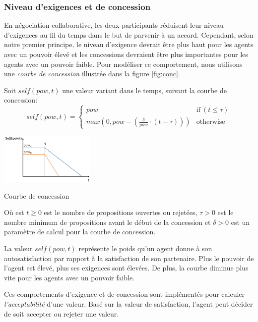 			\subsubsection {Niveau d'exigences et de concession}
			
			En négociation collaborative, les deux participants réduisent leur niveau d'exigences au fil du temps dans le but de parvenir à un accord. Cependant, selon notre premier principe, le niveau d'exigence devrait être plus haut pour les agents avec un pouvoir élevé et les concessions devraient être plus importantes pour les agents avec un pouvoir faible. Pour modéliser ce comportement, nous utilisons une \emph {courbe de concession} illustrée dans la figure \ref {fig:conc}.
			
			Soit $ self (pow, t) $ une valeur variant dans le temps, suivant la courbe de concession:
				\begin{equation}
				self(pow, t) = \left\{\begin{array}{ll}
				pow & \mathrm{if\ } (t \leq \tau)\\
				max(0, pow - (\frac{\delta}{pow} \cdot (t - \tau))) & \mathrm{otherwise}
				\end{array}\right.
				\end{equation}
	
				\begin{floatingfigure}[r]{1.8in}
					\includegraphics[width=1.8in]{graphs/sv3.png}
					\caption{\label{fig:conc}Courbe de concession}
				\end{floatingfigure} 
				
			Où est $ t \geq 0 $ est le nombre de propositions ouvertes ou rejetées, $ \tau> 0 $ est le nombre minimum de propositions avant le début de la concession et $ \delta> 0 $ est un paramètre de calcul pour la courbe de concession.
		
		La valeur $ self (pow, t) $ représente le poids qu'un agent donne à son autosatisfaction par rapport à la satisfaction de son partenaire. Plus le pouvoir de l'agent est élevé, plus ses exigences sont élevées. De plus, la courbe diminue plus vite pour les agents avec un pouvoir faible.
		
		Ces comportements d'exigence et de concession sont implémentés pour calculer \textit{l'acceptabilité} d'une valeur. Basé sur la valeur de satisfaction, l'agent peut décider de soit accepter ou rejeter une valeur.
		
